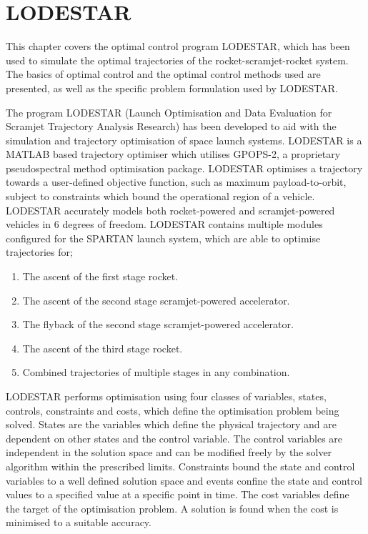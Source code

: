 
\cleardoublepage
\chapter{LODESTAR}\label{chapter:LODESTAR}	
This chapter covers the optimal control program LODESTAR, which has been used to simulate the optimal trajectories of the rocket-scramjet-rocket system. The basics of optimal control and the optimal control methods used are presented, as well as the specific problem formulation used by LODESTAR.

The program LODESTAR (Launch Optimisation and Data Evaluation for Scramjet Trajectory Analysis Research) has been developed to aid with the simulation and trajectory optimisation of space launch systems. LODESTAR is a MATLAB based trajectory optimiser which utilises GPOPS-2, a proprietary pseudospectral method optimisation package. LODESTAR optimises a trajectory towards a user-defined objective function, such as maximum payload-to-orbit, subject to constraints which bound the operational region of a vehicle. LODESTAR accurately models both rocket-powered and scramjet-powered vehicles in 6 degrees of freedom. LODESTAR contains multiple modules configured for the SPARTAN launch system, which are able to optimise trajectories for;

\begin{enumerate}
 \item The ascent of the first stage rocket.
 \item The ascent of the second stage scramjet-powered accelerator.
 \item The flyback of the second stage scramjet-powered accelerator.
 \item The ascent of the third stage rocket.
 \item Combined trajectories of multiple stages in any combination.
\end{enumerate}

LODESTAR performs optimisation using four classes of variables, states, controls, constraints and costs, which define the optimisation problem being solved. States are the variables which define the physical trajectory and are dependent on other states and the control variable. The control variables are independent in the solution space and can be modified freely by the solver algorithm within the prescribed limits.  Constraints bound the state and control variables to a well defined solution space and events confine the state and control values to a specified value at a specific point in time. The cost variables define the target of the optimisation problem. A solution is found when the cost is minimised to a suitable accuracy. 

